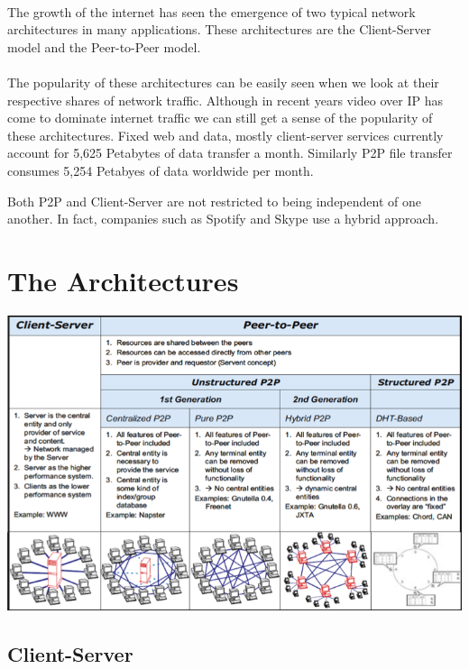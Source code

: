 \documentclass[11pt]{amsart}
\begin{document}
\paragraph{}
The growth of the internet has seen the emergence of two typical network architectures in many applications. These architectures are the Client-Server model and the Peer-to-Peer model. 
\paragraph{}
The popularity of these architectures can be easily seen when we look at their respective shares of network traffic. Although in recent years video over IP has come to dominate internet traffic we can still get a sense of the popularity of these architectures.  
Fixed web and data, mostly client-server services currently account for 5,625 Petabytes of data transfer a month. Similarly P2P file transfer consumes 5,254 Petabyes of data worldwide per month.\cite{Cisco}

Both P2P and Client-Server are not restricted to being independent of one another. In fact, companies such as Spotify and Skype use a hybrid approach.

\section{The Architectures}

\includegraphics[scale=.5]{Architectures}

\subsection{Client-Server}
\end{document}
